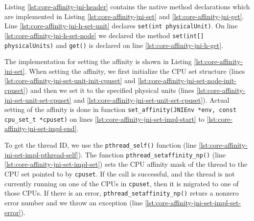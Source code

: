 

Listing \ref{lst:core-affinity-jni-header} contains the native method
declarations which are implemented in Listing
\ref{lst:core-affinity-jni-set} and
\ref{lst:core-affinity-jni-get}. Line
\ref{lst:core-affinity-jni-h-set-unit} declares
\lstinline!set(int physicalUnit)!. On line
\ref{lst:core-affinity-jni-h-set-node} we declared the method
\lstinline!set(int[] physicalUnits)! and \lstinline!get()! is declared
on line \ref{lst:core-affinity-jni-h-get}.



\newpage



\newpage

The implementation for setting the affinity is shown in Listing
\ref{lst:core-affinity-jni-set}. When setting the affinity, we first
initialize the CPU set structure (lines
\ref{lst:core-affinity-jni-set-unit-init-cpuset} and
\ref{lst:core-affinity-jni-set-node-init-cpuset}) and then we set it
to the specified physical units (lines
\ref{lst:core-affinity-jni-set-unit-set-cpuset} and
\ref{lst:core-affinity-jni-set-unit-set-cpuset}). Actual setting of
the affinity is done in function
\lstinline!set_affinity(JNIEnv *env, const cpu_set_t *cpuset)! on lines
\ref{lst:core-affinity-jni-set-impl-start} to
\ref{lst:core-affinity-jni-set-impl-end}.

To get the thread ID, we use the \lstinline!pthread_self()! function
(line \ref{lst:core-affinity-jni-set-impl-pthread-self}). The function
\lstinline!pthread_setaffinity_np()! (line
\ref{lst:core-affinity-jni-set-impl-set}) sets the CPU affinity mask
of the thread to the CPU set pointed to by \lstinline!cpuset!.  If the
call is successful, and the thread is not currently running on one of
the CPUs in \lstinline!cpuset!, then it is migrated to one of those
CPUs. If there is an error, \lstinline!pthread_setaffinity_np()!
returs a nonzero error number and we throw an exception (line
\ref{lst:core-affinity-jni-set-impl-set-error}).

